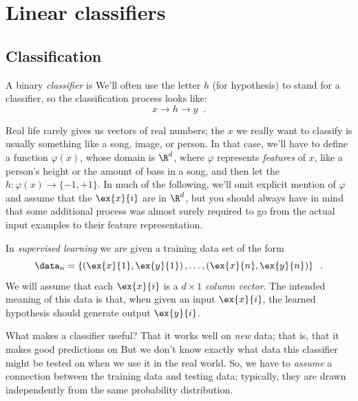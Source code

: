 \chapter{Linear classifiers}
\label{chap-classification}

\section{Classification}

A binary {\em{classifier}} is    We'll often use the
letter $h$ (for hypothesis) to stand for a classifier, so
the classification process looks like:
$$ x \rightarrow \boxed{h} \rightarrow y \;\;.$$

Real life rarely gives us vectors of real numbers;  the $x$ we really
want to classify is usually something like  a song, image, or person.
In that case, we'll have to define a function $\varphi(x)$, whose
domain is $\R^d$, where $\varphi$ represents
  {\em features} of $x$, like a person's height or the amount of bass in
a song, and then let the $h: \varphi(x) \rightarrow \{-1, +1\}$.
In much of the following, we'll omit explicit mention of $\varphi$ and
assume that the $\ex{x}{i}$ are in $\R^d$, but you should always have
in mind that some additional process was almost surely required to go
from the actual input examples to their feature representation.

In {\em{supervised learning}} we are given a training data set of the
form
\[ \data_n = \left\{\left(\ex{x}{1}, \ex{y}{1}\right), \dots, \left(\ex{x}{n},
  \ex{y}{n}\right)\right\} \;\;.\]
We will assume that each $\ex{x}{i}$ is a $d \times 1$ {\em column
    vector}. The intended meaning of this data is that, when given an input
$\ex{x}{i}$, the learned hypothesis should generate output
$\ex{y}{i}$.

What makes a classifier useful? That it works well on {\em new} data;
that is, that it makes good predictions on 
But we don't know exactly what data this classifier might be tested on
when we use it in the real world. So, we have to {\em{assume}} a
connection between the training data and testing data; typically, they
are drawn independently from the same probability distribution.

